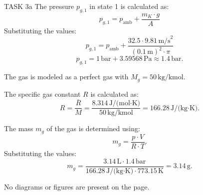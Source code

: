 TASK 3a  
The pressure \( p_{g,1} \) in state 1 is calculated as:  
\[
p_{g,1} = p_{\text{amb}} + \frac{m_K \cdot g}{A}
\]  
Substituting the values:  
\[
p_{g,1} = p_{\text{amb}} + \frac{32.5 \cdot 9.81 \, \text{m/s}^2}{\left(0.1 \, \text{m}\right)^2 \cdot \pi}
\]  
\[
p_{g,1} = 1 \, \text{bar} + 3.59568 \, \text{Pa} \approx 1.4 \, \text{bar}.
\]  

The gas is modeled as a perfect gas with \( M_g = 50 \, \text{kg/kmol} \).  

The specific gas constant \( R \) is calculated as:  
\[
R = \frac{\bar{R}}{M} = \frac{8.314 \, \text{J/(mol·K)}}{50 \, \text{kg/kmol}} = 166.28 \, \text{J/(kg·K)}.
\]  

The mass \( m_g \) of the gas is determined using:  
\[
m_g = \frac{p \cdot V}{R \cdot T}.
\]  
Substituting the values:  
\[
m_g = \frac{3.14 \, \text{L} \cdot 1.4 \, \text{bar}}{166.28 \, \text{J/(kg·K)} \cdot 773.15 \, \text{K}} = 3.14 \, \text{g}.
\]  

No diagrams or figures are present on the page.